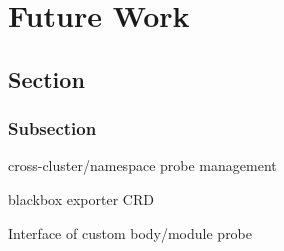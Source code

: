 
\chapter{Future Work}\label{chapter:future_work}

\section{Section}

\subsection{Subsection}

cross-cluster/namespace probe management

blackbox exporter CRD

Interface of custom body/module probe